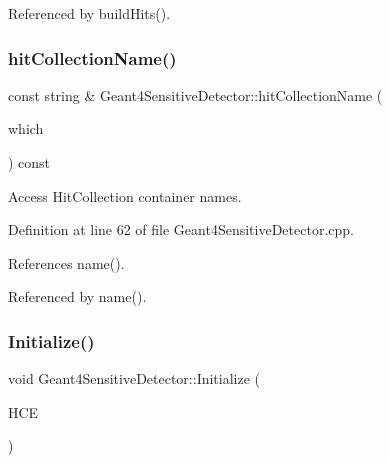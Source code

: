 Referenced by build\+Hits().

\hypertarget{class_d_d4hep_1_1_simulation_1_1_geant4_sensitive_detector_a5959c9da6bc6498e5a443b8553e6f573}{}\label{class_d_d4hep_1_1_simulation_1_1_geant4_sensitive_detector_a5959c9da6bc6498e5a443b8553e6f573} 
\subsubsection{\texorpdfstring{hit\+Collection\+Name()}{hitCollectionName()}}
{\footnotesize\ttfamily const string \& Geant4\+Sensitive\+Detector\+::hit\+Collection\+Name (\begin{DoxyParamCaption}\item[{int}]{which }\end{DoxyParamCaption}) const}



Access Hit\+Collection container names. 



Definition at line 62 of file Geant4\+Sensitive\+Detector.\+cpp.



References name().



Referenced by name().

\hypertarget{class_d_d4hep_1_1_simulation_1_1_geant4_sensitive_detector_a7ee158e29937473f04db1cc6c7284923}{}\label{class_d_d4hep_1_1_simulation_1_1_geant4_sensitive_detector_a7ee158e29937473f04db1cc6c7284923} 
\subsubsection{\texorpdfstring{Initialize()}{Initialize()}}
{\footnotesize\ttfamily void Geant4\+Sensitive\+Detector\+::\+Initialize (\begin{DoxyParamCaption}\item[{G4\+H\+Cof\+This\+Event $\ast$}]{H\+CE }\end{DoxyParamCaption})\hspace{0.3cm}{\ttfamily [virtual]}}



